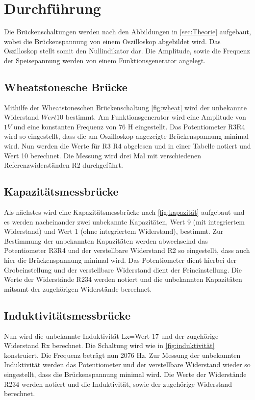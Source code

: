 \section{Durchführung}
\label{sec:Durchführung}

Die Brückenschaltungen werden nach den Abbildungen in \autoref{sec:Theorie} aufgebaut, wobei die Brückenspannung von einem Oszilloskop abgebildet wird.
Das Oszilloskop stellt somit den Nullindikator dar. Die Amplitude, sowie die Frequenz der Speisepannung werden von einem Funktionsgenerator angelegt.

\subsection{Wheatstonesche Brücke}
\label{subsec:wheatstone_durch}
Mithilfe der Wheatstoneschen Brückenschaltung \autoref{fig:wheat} wird der unbekannte Widerstand $Wert 10$ bestimmt.
Am Funktionsgenerator wird eine Amplitude von $1V$ und eine konstanten Frequenz von 76 H eingestellt.
Das Potentiometer R3R4 wird so eingestellt, dass die am Oszilloskop angezeigte Brückenspannung
minimal wird. Nun werden die Werte für R3 R4 abgelesen und in einer Tabelle notiert und Wert 10 berechnet.
Die Messung wird drei Mal mit verschiedenen Referenzwiderständen R2 durchgeführt.

\subsection{Kapazitätsmessbrücke}
\label{subsec:kapazitäts_durch}
Als nächstes wird eine Kapazitätsmessbrücke nach \autoref{fig:kapazität} aufgebaut und es werden nacheinander zwei unbekannte Kapazitäten, Wert 9 (mit integriertem Widerstand) und Wert 1 (ohne integriertem Widerstand),
bestimmt. Zur Bestimmung der unbekannten Kapazitäten werden abwechselnd das Potentiometer R3R4 und der verstellbare Widerstand R2 so eingestellt,
dass auch hier die Brückenspannung minimal wird. Das Potentiometer dient hierbei der Grobeinstellung und der verstellbare Widerstand dient der Feineinstellung.
Die Werte der Widerstände R234 werden notiert und die unbekannten Kapazitäten mitsamt der zugehörigen Widerstände berechnet.

\subsection{Induktivitätsmessbrücke}
\label{subsec:induktivität_durch}
Nun wird die unbekannte Induktivität Lx=Wert 17 und der zugehörige Widerstand Rx berechnet. Die Schaltung wird wie in \autoref{fig:induktivität} konstruiert.
Die Frequenz beträgt nun 2076 Hz.
Zur Messung der unbekannten Induktivität werden das Potentiometer und der verstellbare Widerstand wieder so eingestellt, dass die Brückenspannung minimal wird.
Die Werte der Widerstände R234 werden notiert und die Induktivität, sowie der zugehörige Widerstand berechnet.


